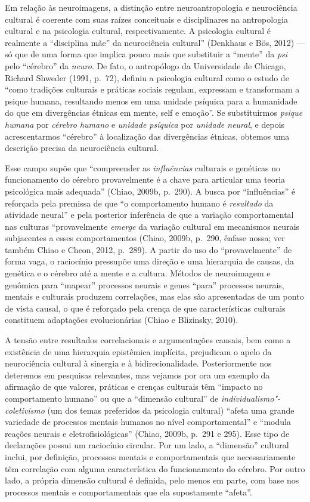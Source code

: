 Em relação às neuroimagens, a distinção entre neuroantropologia e
neurociência cultural é coerente com suas raízes conceituais e
disciplinares na antropologia cultural e na psicologia cultural,
respectivamente. A psicologia cultural é realmente a ``disciplina mãe''
da neurociência cultural'' (Denkhaus e Bös, 2012) --- só que de uma
forma que implica pouco mais que substituir a ``mente'' da \emph{psi}
pelo ``cérebro'' da \emph{neuro}. De fato, o antropólogo da Universidade
de Chicago, Richard Shweder (1991, p.~72), definiu a psicologia cultural
como o estudo de ``como tradições culturais e práticas sociais regulam,
expressam e transformam a psique humana, resultando menos em uma unidade
psíquica para a humanidade do que em divergências étnicas em mente, self
e emoção''. Se substituirmos \emph{psique humana} por \emph{cérebro
humano} e \emph{unidade psíquica} por \emph{unidade neural}, e depois
acrescentarmos ``cérebro'' à localização das divergências étnicas,
obtemos uma descrição precisa da neurociência cultural.

Esse campo supõe que ``compreender as \emph{influências} culturais e
genéticas no funcionamento do cérebro provavelmente é a chave para
articular uma teoria psicológica mais adequada'' (Chiao, 2009b, p.~290).
A busca por ``influências'' é reforçada pela premissa de que ``o
comportamento humano é \emph{resultado} da atividade neural'' e pela
posterior inferência de que a variação comportamental nas culturas
``provavelmente \emph{emerge} da variação cultural em mecanismos neurais
subjacentes a esses comportamentos (Chiao, 2009b, p.~290, ênfase nossa;
ver também Chiao e Cheon, 2012, p.~289). A partir do uso do
``provavelmente'' de forma vaga, o raciocínio pressupõe uma direção e
uma hierarquia de causas, da genética e o cérebro até a mente e a
cultura. Métodos de neuroimagem e genômica para ``mapear'' processos
neurais e genes ``para'' processos neurais, mentais e culturais produzem
correlações, mas elas são apresentadas de um ponto de vista causal, o
que é reforçado pela crença de que características culturais constituem
adaptações evolucionárias (Chiao e Blizinsky, 2010).

A tensão entre resultados correlacionais e argumentações causais, bem
como a existência de uma hierarquia epistêmica implícita, prejudicam o
apelo da neurociência cultural à sinergia e à bidirecionalidade.
Posteriormente nos deteremos em pesquisas relevantes, mas vejamos por
ora um exemplo da afirmação de que valores, práticas e crenças culturais
têm ``impacto no comportamento humano'' ou que a ``dimensão cultural''
de \emph{individualismo"-coletivismo} (um dos temas preferidos da
psicologia cultural) ``afeta uma grande variedade de processos mentais
humanos no nível comportamental'' e ``modula reações neurais e
eletrofisiológicas'' (Chiao, 2009b, p.~291 e 295). Esse tipo de
declarações possui um raciocínio circular. Por um lado, a ``dimensão''
cultural inclui, por definição, processos mentais e comportamentais que
necessariamente têm correlação com alguma característica do
funcionamento do cérebro. Por outro lado, a própria dimensão cultural é
definida, pelo menos em parte, com base nos processos mentais e
comportamentais que ela supostamente ``afeta''.

